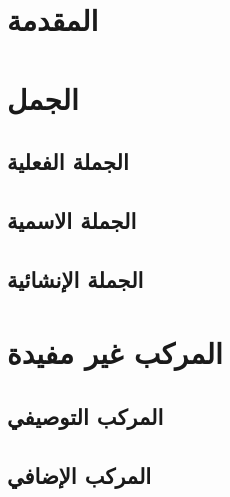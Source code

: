 \documentclass[11pt,twoside]{book}
\begin{document}
\clearpage

\thispagestyle{empty}
\setcounter{tocdepth}{1}
\tableofcontents
\thispagestyle{empty}
\pagebreak
\thispagestyle{empty}
\listoffigures
\listoftables

\mainmatter

\chapter{المقدمة}




\chapter{الجمل}



\section{الجملة الفعلية}



\section{الجملة الاسمية}



\section{الجملة الإنشائية}



\chapter{المركب غير مفيدة}



\section{المركب التوصيفي}



\section{المركب الإضافي}
\end{document}
